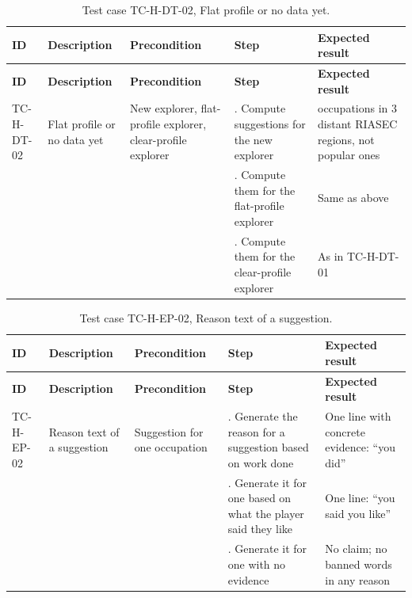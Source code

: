 {\small
\begin{longtable}{|>{\raggedright\arraybackslash}p{}|>{\raggedright\arraybackslash}p{}|>{\raggedright\arraybackslash}p{}|>{\raggedright\arraybackslash}p{}|>{\raggedright\arraybackslash}p{}|}
\caption{Test case TC-H-DT-02, Flat profile or no data yet.} \\
\hline
\textbf{ID} & \textbf{Description} & \textbf{Precondition} & \textbf{Step} & \textbf{Expected result} \\ \hline
\endfirsthead
\hline
\textbf{ID} & \textbf{Description} & \textbf{Precondition} & \textbf{Step} & \textbf{Expected result} \\ \hline
\endhead
TC-H-DT-02 & Flat profile or no data yet & New explorer, flat-profile explorer, clear-profile explorer & 1. Compute suggestions for the new explorer & 3 occupations in 3 distant RIASEC regions, not popular ones \\ \hline
 &  &  & 2. Compute them for the flat-profile explorer & Same as above \\ \hline
 &  &  & 3. Compute them for the clear-profile explorer & As in TC-H-DT-01 \\ \hline
\end{longtable}
}

{\small
\begin{longtable}{|>{\raggedright\arraybackslash}p{}|>{\raggedright\arraybackslash}p{}|>{\raggedright\arraybackslash}p{}|>{\raggedright\arraybackslash}p{}|>{\raggedright\arraybackslash}p{}|}
\caption{Test case TC-H-EP-02, Reason text of a suggestion.} \\
\hline
\textbf{ID} & \textbf{Description} & \textbf{Precondition} & \textbf{Step} & \textbf{Expected result} \\ \hline
\endfirsthead
\hline
\textbf{ID} & \textbf{Description} & \textbf{Precondition} & \textbf{Step} & \textbf{Expected result} \\ \hline
\endhead
TC-H-EP-02 & Reason text of a suggestion & Suggestion for one occupation & 1. Generate the reason for a suggestion based on work done & One line with concrete evidence: ``you did'' \\ \hline
 &  &  & 2. Generate it for one based on what the player said they like & One line: ``you said you like'' \\ \hline
 &  &  & 3. Generate it for one with no evidence & No claim; no banned words in any reason \\ \hline
\end{longtable}
}

